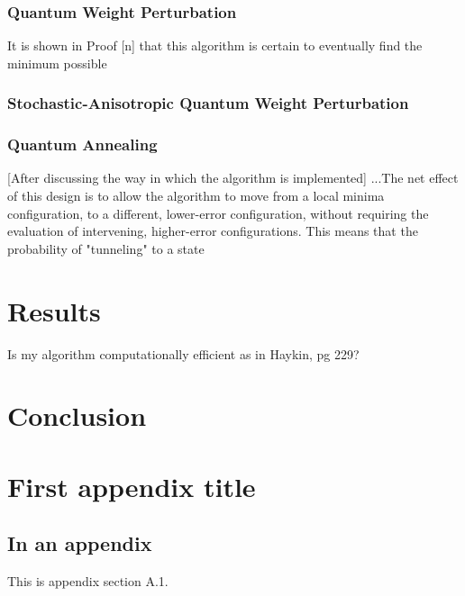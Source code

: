 \documentclass[11pt]{afthesis}
\begin{document}
	\subsection{Quantum Weight Perturbation}
	
	
	It is shown in Proof [n] that this algorithm is certain to eventually find the minimum possible
	
	
	\subsection{Stochastic-Anisotropic Quantum Weight Perturbation}
	
	
	
	\subsection{Quantum Annealing}
	
	
	[After discussing the way in which the algorithm is implemented] ...The net effect of this design is to allow the algorithm to move from a local minima configuration, to a different, lower-error configuration, without requiring the evaluation of intervening, higher-error configurations. This means that the probability of "tunneling" to a state
	
	
	
	
	\chapter{Results}
	
	Is my algorithm computationally efficient as in Haykin, pg 229?
	\chapter{Conclusion}
	
	
	\appendix		%
	
	\chapter{First appendix title}
	
	\section{In an appendix} 
	
	This is appendix section A.1.
	
\end{document}
